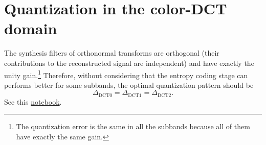 \begin{comment}
For example, the
2x2-\href{https://en.wikipedia.org/wiki/Karhunen-Loeve_theorem}{KLT}~\cite{sayood2017introduction}
is defined by
\begin{equation}
  \begin{bmatrix}
    {\mathbf{y}}_0 \\
    {\mathbf{y}}_1
  \end{bmatrix}
  = 
  \begin{bmatrix} \frac{1}{\sqrt{2}} & \frac{1}{\sqrt{2}} \\ \frac{1}{\sqrt{2}} & \frac{-1}{\sqrt{2}} \end{bmatrix}
  \begin{bmatrix}
    {\mathbf{x}}_0 \\
    {\mathbf{x}}_1
  \end{bmatrix},
  \label{eq:KLT_transform}
\end{equation}
and it holds that
\begin{equation}
  \mathbf{K}={\mathbf{K}}^{-1}={\mathbf{K}}^{\text T},
  \label{eq:orthogonal_matrix}
\end{equation}
where ${\mathbf{K}}^{\text T}$ represents the transpose matrix of
$\mathbf{K}$.  Eq.~\ref{eq:orthogonal_matrix} is true for all
\href{https://en.wikipedia.org/wiki/Orthogonality}{orthogonal}
transforms, and therefore
\begin{equation}
  \langle {\mathbf{K}}_i, {\mathbf{K}}_j\rangle = 0, \forall i\neq j.
\end{equation}
\end{comment}

\section{Quantization in the color-DCT domain}
The synthesis filters of orthonormal transforms are orthogonal (their
contributions to the reconstructed signal are independent) and have
exactly the unity gain.\footnote{The quantization error is the same in
all the subbands because all of them have exactly the same gain.}
Therefore, without considering that the entropy coding stage can
performs better for some subbands, the optimal quantization pattern
should be
\begin{equation}
  \Delta_{\text{DCT0}} = \Delta_{\text{DCT1}} = \Delta_{\text{DCT2}}.
\end{equation}
See this \href{https://github.com/Sistemas-Multimedia/Sistemas-Multimedia.github.io/blob/master/study_guide/06-color_transform/color-DCT_compression.ipynb}{notebook}.

